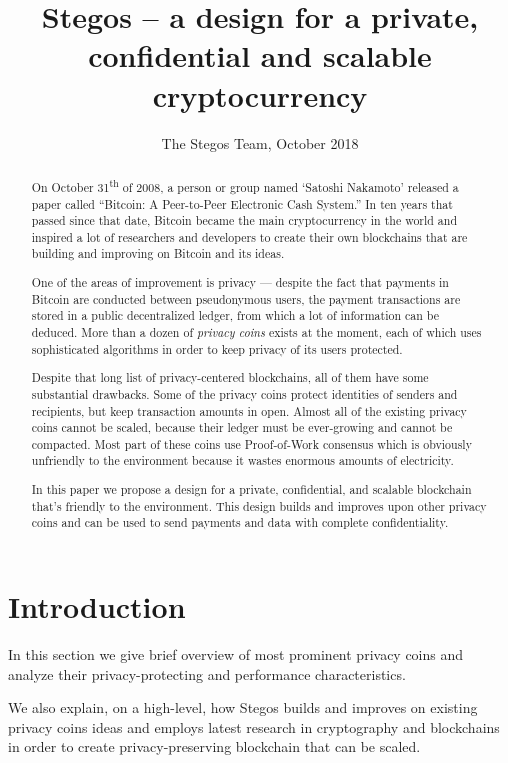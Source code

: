 \documentclass[a4paper, 10pt, conference]{ieeeconf}
\title{\LARGE \bf
Stegos  -- a design for a private, confidential and scalable cryptocurrency}
\author{The Stegos Team, October 2018}%
\begin{document}
\maketitle
\thispagestyle{empty}
\pagestyle{plain}


\begin{abstract}
    On October 31\textsuperscript{th} of 2008, a person or group named ‘Satoshi Nakamoto’ released a paper called ``Bitcoin: A Peer-to-Peer Electronic Cash System.''\cite{c1} In ten years that passed since that date, Bitcoin became the main cryptocurrency in the world and inspired a lot of researchers and developers to create their own blockchains that are building and improving on Bitcoin and its ideas.
    
    One of the areas of improvement is privacy --- despite the fact that payments in Bitcoin are conducted between pseudonymous users, the payment transactions are stored in a public decentralized ledger, from which a lot of information can be deduced. More than a dozen of \textit{privacy coins} exists at the moment, each of which uses sophisticated algorithms in order to keep privacy of its users protected. 
    
    Despite that long list of privacy-centered blockchains, all of them have some substantial drawbacks. Some of the privacy coins protect identities of senders and recipients, but keep transaction amounts in open. Almost all of the existing privacy coins cannot be scaled, because their ledger must be ever-growing and cannot be compacted. Most part of these coins use Proof-of-Work consensus which is obviously unfriendly to the environment because it wastes enormous amounts of electricity. 
    
    In this paper we propose a design for a private, confidential, and scalable blockchain that’s friendly to the environment. This design builds and improves upon other privacy coins and can be used to send payments and data with complete confidentiality. 
\end{abstract}

\section{Introduction}
In this section we give brief overview of most prominent privacy coins and analyze their privacy-protecting and performance characteristics.

We also explain, on a high-level, how Stegos builds and improves on existing privacy coins ideas and employs latest research in cryptography and blockchains in order to create privacy-preserving blockchain that can be scaled. 
\end{document}
